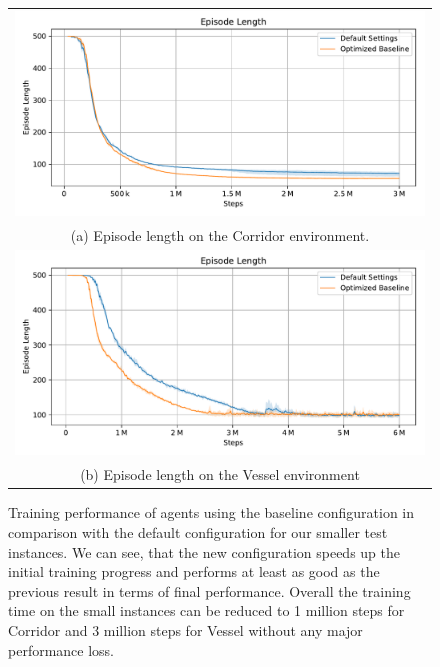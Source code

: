 \begin{figure}[htp]
    \begin{center}
        \begin{tabular}{c}
            \includegraphics[clip, width=0.95\columnwidth]{figures/evaluation/baseline/maze0318_ep_len.pdf} \\
            {\small (a) Episode length on the Corridor environment.} \\
            \addlinespace[0.75cm]
            \includegraphics[clip, width=0.95\columnwidth]{figures/evaluation/baseline/vessel_ep_len.pdf} \\
            {\small (b) Episode length on the Vessel environment} \\
        \end{tabular}

    \end{center}
    \caption[Training Performance of Baseline Agents on Small Instances]{Training performance of agents using the baseline configuration in comparison with the default configuration for our smaller test instances. We can see, that the new configuration speeds up the initial training progress and performs at least as good as the previous result in terms of final performance. Overall the training time on the small instances can be reduced to 1 million steps for Corridor and 3 million steps for Vessel without any major performance loss.} \label{fig:Eval/Baselines/SmallInstances}
\end{figure}


